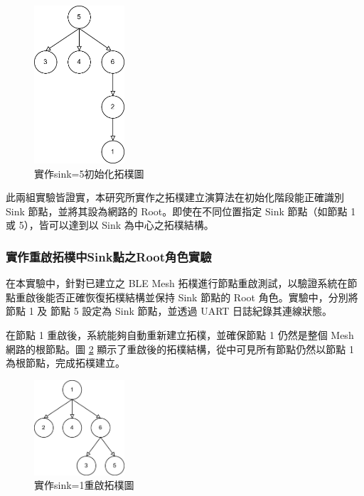 \begin{ZhChapter}
\begin{figure}[H]
    \centering
    \includegraphics[width = 0.3\textwidth]{image/實作sink=5初始化拓樸圖.jpg}
    \caption{實作sink=5初始化拓樸圖}
    \label{fig: 實作sink=5初始化拓樸圖}
\end{figure}

此兩組實驗皆證實，本研究所實作之拓樸建立演算法在初始化階段能正確識別 Sink 節點，並將其設為網路的 Root。即使在不同位置指定 Sink 節點（如節點 1 或 5），皆可以達到以 Sink 為中心之拓樸結構。

\subsubsection{實作重啟拓樸中Sink點之Root角色實驗}
在本實驗中，針對已建立之 BLE Mesh 拓樸進行節點重啟測試，以驗證系統在節點重啟後能否正確恢復拓樸結構並保持 Sink 節點的 Root 角色。實驗中，分別將節點 1 及 節點 5 設定為 Sink 節點，並透過 UART 日誌紀錄其連線狀態。

在節點 1 重啟後，系統能夠自動重新建立拓樸，並確保節點 1 仍然是整個 Mesh 網路的根節點。圖 \ref{fig: 實作sink=1重啟拓樸圖} 顯示了重啟後的拓樸結構，從中可見所有節點仍然以節點 1 為根節點，完成拓樸建立。

\begin{figure}[H]
    \centering
    \includegraphics[width = 0.3\textwidth]{image/實作sink=1重啟拓樸圖.jpg}
    \caption{實作sink=1重啟拓樸圖}
    \label{fig: 實作sink=1重啟拓樸圖}
\end{figure}


\end{ZhChapter}
